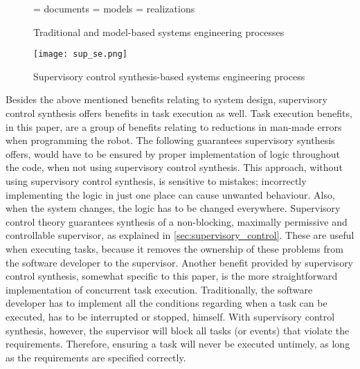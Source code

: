 \begin{figure}
\begin{center}


\scriptsize{
   = documents
   = models
   = realizations}
\end{center}
\caption{Traditional and model-based systems engineering processes}
  \label{fig:TR_and_MB_SE_processes}
\end{figure}


\begin{figure}[!h]
  \centering
  \texttt{[image: sup\_se.png]}
  \caption{Supervisory control synthesis-based systems engineering process}\label{fig:sup_se}
\end{figure}
\newpage
Besides the above mentioned benefits relating to system design, supervisory control synthesis offers benefits in task execution as well.
Task execution benefits, in this paper, are a group of benefits relating to reductions in man-made errors when programming the robot.
The following guarantees supervisory synthesis offers, would have to be ensured by proper implementation of logic throughout the code, when not using supervisory control synthesis.
This approach, without using supervisory control synthesis, is sensitive to mistakes; incorrectly implementing the logic in just one place can cause unwanted behaviour.
Also, when the system changes, the logic has to be changed everywhere.
Supervisory control theory guarantees synthesis of a non-blocking, maximally permissive and controllable supervisor, as explained in \cref{sec:supervisory_control}.
These are useful when executing tasks, because it removes the ownership of these problems from the software developer to the supervisor.
Another benefit provided by supervisory control synthesis, somewhat specific to this paper, is the more straightforward implementation of concurrent task execution.
Traditionally, the software developer has to implement all the conditions regarding when a task can be executed, has to be interrupted or stopped, himself.
With supervisory control synthesis, however, the supervisor will block all tasks (or events) that violate the requirements.
Therefore, ensuring a task will never be executed untimely, as long as the requirements are specified correctly.\\

